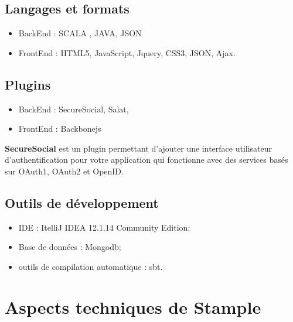 \subsection{Langages et formats}
\begin{itemize}
\item BackEnd : SCALA , JAVA, JSON
\item FrontEnd : HTML5, JavaScript, Jquery, CSS3, JSON, Ajax. 
\end{itemize}
\subsection{Plugins}
\begin{itemize}
\item BackEnd : SecureSocial, Salat, 
\item FrontEnd : Backbonejs 
\end{itemize}
\textbf{SecureSocial} est un plugin permettant d'ajouter une interface utilisateur d'authentification pour votre application qui fonctionne avec des services basés sur OAuth1, OAuth2 et OpenID.
\subsection{Outils de développement}
\begin{itemize}
\item IDE : ItelliJ IDEA 12.1.14 Community Edition;
\item Base de données : Mongodb;
\item outils de compilation automatique : sbt.
\end{itemize}
\section{Aspects techniques de Stample}
